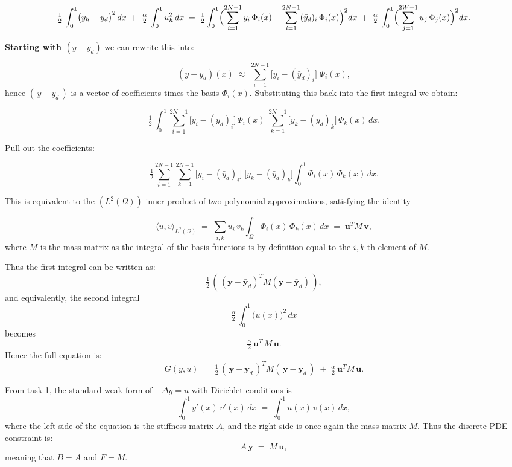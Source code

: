 \[
	\tfrac12\,\int_{0}^{1}\bigl(y_{h}-y_{d}\bigr)^{2}\,dx
	\;+\;
	\tfrac{\alpha}{2}\,\int_{0}^{1}u_{h}^{2}\,dx
	\;=\;
	\tfrac12 \int_{0}^{1}
	\Bigl(\sum_{i=1}^{2N-1}y_{i}\,\Phi_{i}(x)
	-
	\sum_{i=1}^{2N-1}(\bar{y}_{d})_{i}\,\Phi_{i}(x)\Bigr)^{2}
	dx
	\;+\;
	\tfrac{\alpha}{2}\,\int_{0}^{1}
	\Bigl(\sum_{j=1}^{2W-1}u_{j}\,\Phi_{j}(x)\Bigr)^{2}dx.
\]

\bigskip

\textbf{Starting with $(y-y_{d})$} we can rewrite this into:

\[
	(y - y_{d})(x)
	\;\approx\;
	\sum_{i=1}^{2N-1}\bigl[y_{i} - (\bar{y}_{d})_{i}\bigr]\;\Phi_{i}(x),
\]
hence $(\,y - y_{d}\,)$ is a vector of coefficients times the basis $\Phi_{i}(x)$. Substituting this back into
the first integral we obtain:

\[
	\tfrac12\,\int_{0}^{1}
	\sum_{i=1}^{2N-1}\bigl[y_{i} - (\bar{y}_{d})_{i}\bigr]\,\Phi_{i}(x)
	\;\sum_{k=1}^{2N-1}\bigl[y_{k} - (\bar{y}_{d})_{k}\bigr]\,\Phi_{k}(x)\,dx.
\]

Pull out the coefficients:

\[
	\tfrac12
	\sum_{i=1}^{2N-1}\sum_{k=1}^{2N-1}
	\bigl[y_{i} - (\bar{y}_{d})_{i}\bigr]\;\bigl[y_{k} - (\bar{y}_{d})_{k}\bigr]
	\int_{0}^{1}\Phi_{i}(x)\,\Phi_{k}(x)\,dx.
\]

This is equivalent to the $(L^2(\Omega))$ inner product of two polynomial approximations, satisfying the identity

\[
	\langle u,v\rangle_{L^2(\Omega)}
	\;=\;
	\sum_{i,k} u_{i}\,v_{k}\int_{\Omega}\Phi_{i}(x)\,\Phi_{k}(x)\,dx
	\;=\;
	\mathbf{u}^{T}M\,\mathbf{v},
\]
where $M$ is the mass matrix as the integral of the basis functions is by definition equal to the $i,k$-th
element of $M$.

\medskip

\noindent
Thus the first integral can be written as:
\[
	\tfrac12\,(\,(\mathbf{y}-\bar{\mathbf{y}}_{d})^{T}M(\mathbf{y}-\bar{\mathbf{y}}_{d})\,),
\]
and equivalently, the second integral
\[
	\tfrac{\alpha}{2}\,\int_{0}^{1}\bigl(u(x)\bigr)^{2}\,dx
\]
becomes
\[
	\tfrac{\alpha}{2}\,\mathbf{u}^{T}\,M\,\mathbf{u}.
\]
Hence the full equation is:
\[
	G(y,u)
	\;=\;
	\tfrac12\,(\,\mathbf{y}-\bar{\mathbf{y}}_{d}\,)^{T}M(\,\mathbf{y}-\bar{\mathbf{y}}_{d}\,)
	\;+\;
	\tfrac{\alpha}{2}\,\mathbf{u}^{T}M\,\mathbf{u}.
\]

\bigskip

\noindent
From task 1, the standard weak form of $-\Delta y = u$ with Dirichlet conditions is
\[
	\int_{0}^{1}y'(x)\,v'(x)\,dx
	\;=\;
	\int_{0}^{1}u(x)\,v(x)\,dx,
\]
where the left side of the equation is the stiffness matrix $A$, and the right side is once again the mass matrix $M$.
Thus the discrete PDE constraint is:
\[
	A\,\mathbf{y}\;=\;M\,\mathbf{u},
\]
meaning that $B = A$ and $F = M$.

